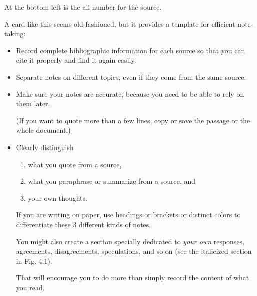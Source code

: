 \documentclass[oneside]{book}
\numberwithin{equation}{section}
\begin{document}
At the bottom left is the all number for the source.

%
A card like this seems old-fashioned, but it provides a template for efficient note-taking:
\begin{itemize}
    \item Record complete bibliographic information for each source so that you can cite it properly and find it again easily.
    \item Separate notes on different topics, even if they come from the same source.
    \item Make sure your notes are accurate, because you need to be able to rely on them later.
    
    (If you want to quote more than a few lines, copy or save the passage or the whole document.)
    \item Clearly distinguish
    \begin{enumerate}
        \item what you quote from a source,
        \item what you paraphrase or summarize from a source, and
        \item your own thoughts.
    \end{enumerate}
    If you are writing on paper, use headings or brackets or distinct colors to differentiate these 3 different kinds of notes.
    
    You might also create a section specially dedicated to \textit{your own} responses, agreements, disagreements, speculations, and so on (see the italicized section in Fig. 4.1).
    
    That will encourage you to do more than simply record the content of what you read.
\end{itemize}
\end{document}
